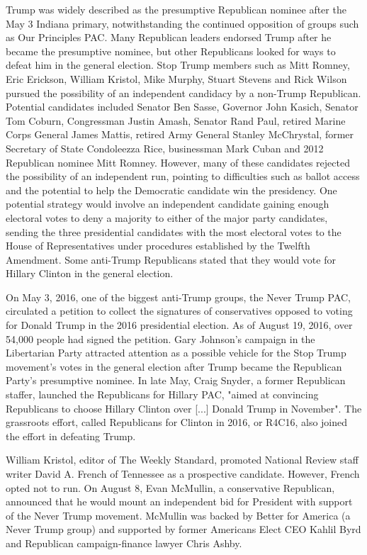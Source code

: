 Trump was widely described as the presumptive Republican nominee after
the May 3 Indiana primary, notwithstanding the continued opposition of
groups such as Our Principles PAC. Many Republican leaders endorsed
Trump after he became the presumptive nominee, but other Republicans
looked for ways to defeat him in the general election. Stop Trump
members such as Mitt Romney, Eric Erickson, William Kristol, Mike
Murphy, Stuart Stevens and Rick Wilson pursued the possibility of an
independent candidacy by a non-Trump Republican. Potential candidates
included Senator Ben Sasse, Governor John Kasich, Senator Tom Coburn,
Congressman Justin Amash, Senator Rand Paul, retired Marine Corps
General James Mattis, retired Army General Stanley McChrystal, former
Secretary of State Condoleezza Rice, businessman Mark Cuban and 2012
Republican nominee Mitt Romney. However, many of these candidates
rejected the possibility of an independent run, pointing to difficulties
such as ballot access and the potential to help the Democratic candidate
win the presidency. One potential strategy would involve an independent
candidate gaining enough electoral votes to deny a majority to either of
the major party candidates, sending the three presidential candidates
with the most electoral votes to the House of Representatives under
procedures established by the Twelfth Amendment. Some anti-Trump
Republicans stated that they would vote for Hillary Clinton in the
general election.

On May 3, 2016, one of the biggest anti-Trump groups, the Never Trump
PAC, circulated a petition to collect the signatures of conservatives
opposed to voting for Donald Trump in the 2016 presidential election. As
of August 19, 2016, over 54,000 people had signed the petition. Gary
Johnson's campaign in the Libertarian Party attracted attention as a
possible vehicle for the Stop Trump movement's votes in the general
election after Trump became the Republican Party's presumptive nominee.
In late May, Craig Snyder, a former Republican staffer, launched the
Republicans for Hillary PAC, "aimed at convincing Republicans to choose
Hillary Clinton over {[}...{]} Donald Trump in November". The grassroots
effort, called Republicans for Clinton in 2016, or R4C16, also joined
the effort in defeating Trump.

William Kristol, editor of The Weekly Standard, promoted National Review
staff writer David A. French of Tennessee as a prospective candidate.
However, French opted not to run. On August 8, Evan McMullin, a
conservative Republican, announced that he would mount an independent
bid for President with support of the Never Trump movement. McMullin was
backed by Better for America (a Never Trump group) and supported by
former Americans Elect CEO Kahlil Byrd and Republican campaign-finance
lawyer Chris Ashby.

